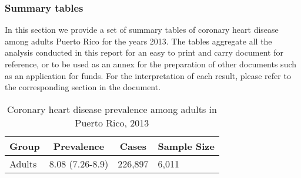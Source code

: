 \newpage
\subsubsection{Summary tables}
In this section we provide a set of summary tables of coronary heart disease among adults Puerto Rico for the years 2013. The tables aggregate all the analysis conducted in this report for an easy to print and carry document for reference, or to be used as an annex for the preparation of other documents such as an application for funds. For the interpretation of each result, please refer to the corresponding section in the document.

\begin{table}[H]
\caption{Coronary heart disease prevalence among adults in Puerto Rico, 2013\label{tab:Overall.tabl.Coronary_Heart_Disease.2013}} 
\begin{center}
\begin{tabular}{llll}
\hline\hline
\multicolumn{1}{l}{Group}&\multicolumn{1}{c}{Prevalence}&\multicolumn{1}{c}{Cases}&\multicolumn{1}{c}{Sample Size}\tabularnewline
\hline
Adults&8.08 (7.26-8.9)&226,897&6,011\tabularnewline
\hline
\end{tabular}\end{center}

\end{table}

